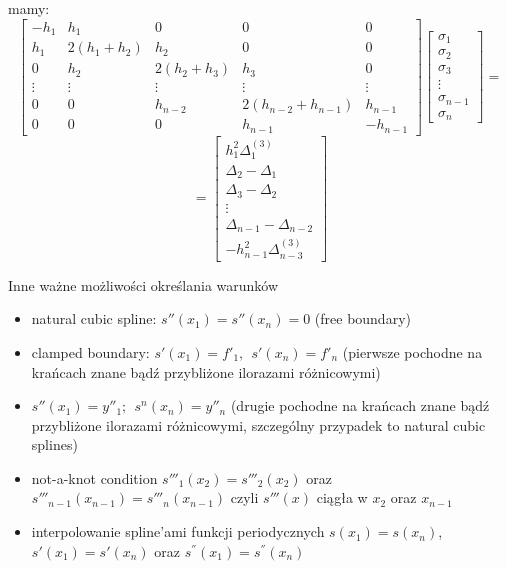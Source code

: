     \begin{frame}
    	mamy:
        \[
        \begin{bmatrix}
    -h_{1} & h_{1} & 0 & 0  & 0 \\
    h_{1} & 2(h_{1}+h_{2}) & h_{2} & 0  & 0 \\
    0 & h_{2} & 2(h_{2}+h_{3}) & h_{3} & 0 \\
    \vdots & \vdots & \vdots & \vdots & \vdots \\
    0 & 0 & h_{n-2} & 2(h_{n-2}+h_{n-1}) & h_{n-1} \\
    0 & 0 & 0 & h_{n-1}  & -h_{n-1}
		\end{bmatrix}
        \begin{bmatrix}
        	\sigma_{1} \\
            \sigma_{2} \\
            \sigma_{3} \\
            \vdots \\
            \sigma_{n-1} \\
            \sigma_{n}
        \end{bmatrix}
       	=
        \]
        \[	=
        	\begin{bmatrix}
        		h_{1}^{2}\Delta^{(3)}_{1} \\
                \Delta_{2} - \Delta_{1} \\
                \Delta_{3} - \Delta_{2} \\
                \vdots \\ 
                \Delta_{n-1} - \Delta_{n-2} \\
                -h_{n-1}^{2}\Delta^{(3)}_{n-3}
        	\end{bmatrix}
        \]
    \end{frame}
    \begin{frame}{Inne ważne możliwości określania warunków}
    	\begin{itemize}
    		\item natural cubic spline: $s''(x_{1})=s''(x_{n})=0$ (free boundary)
            \item clamped boundary: $s'(x_{1})=f'_{1}, \ \ s'(x_{n})=f'_{n}$ (pierwsze pochodne na krańcach znane bądź przybliżone ilorazami różnicowymi)
            \item $s''(x_{1})=y''_{1}; \ \ s^{n}(x_{n})=y''_{n}$ (drugie pochodne na krańcach znane bądź przybliżone ilorazami różnicowymi, szczególny przypadek to natural cubic splines)
            \item not-a-knot condition $s'''_1(x_2)=s'''_2(x_2)$ oraz $s'''_{n-1}(x_{n-1})=s'''_{n}(x_{n-1})$  czyli $s'''(x)$ ciągła w $x_{2}$ oraz $x_{n-1}$
            \item interpolowanie spline'ami funkcji periodycznych
            $s(x_1)=s(x_n)$,
            $s'(x_1)=s'(x_n)$ oraz
            $s^{''}(x_1)=s^{''}(x_n)$
    	\end{itemize}
    \end{frame}
